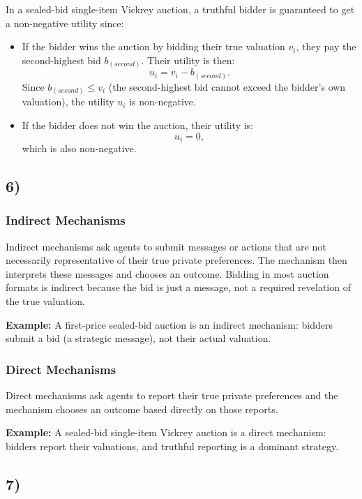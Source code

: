 \documentclass[10pt]{article}
\begin{document}
In a sealed-bid single-item Vickrey auction, a truthful bidder is guaranteed to get a non-negative utility since:
\begin{itemize}
\item If the bidder wins the auction by bidding their true valuation $v_i$, they pay the second-highest bid $b_{(second)}$. Their utility is then:
\[u_i = v_i - b_{(second)}.\]
Since $b_{(second)} \leq v_i$ (the second-highest bid cannot exceed the bidder's own valuation), the utility $u_i$ is non-negative.
\item If the bidder does not win the auction, their utility is:
\[u_i = 0,\]
which is also non-negative.
\end{itemize}

\subsection*{6)}

\subsubsection*{Indirect Mechanisms}

Indirect mechanisms ask agents to submit messages or actions that are not necessarily representative of their true private preferences. The mechanism then interprets these messages and chooses an outcome. Bidding in most auction formats is indirect because the bid is just a message, not a required revelation of the true valuation.

\textbf{Example:} A first-price sealed-bid auction is an indirect mechanism: bidders submit a bid (a strategic message), not their actual valuation.

\subsubsection*{Direct Mechanisms}

Direct mechanisms ask agents to report their true private preferences and the mechanism chooses an outcome based directly on those reports.

\textbf{Example:} A sealed-bid single-item Vickrey auction is a direct mechanism: bidders report their valuations, and truthful reporting is a dominant strategy.

\subsection*{7)}
\end{document}
